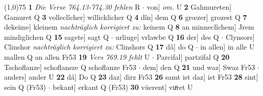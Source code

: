 \documentclass[8pt,a4paper,notitlepage]{article}
\begin{document}
\begin{table}[ht]
\begin{minipage}[t]{0.5\linewidth}
\line(1,0){75} \newline
\textbf{1} \textit{Die Verse 764.13-774.30 fehlen} R   $\cdot$ von] \textit{om.} U \textbf{2} Gahmureten] Gamuret Q \textbf{3} volleclîcher] willicklicher Q \textbf{4} dîn] dem Q \textbf{6} grœzer] grozest Q \textbf{7} dekeime] kleinem \textit{nachträglich korrigiert zu:} keinem Q \textbf{8} an minneclîchem] Jrem mindiglichen Q \textbf{15} sagete] sagt Q  $\cdot$ urliuge] vrlawbe Q \textbf{16} der] des Q  $\cdot$ Clynsors] Clinshor \textit{nachträglich korrigiert zu:} Clinshors Q \textbf{17} dâ] do Q  $\cdot$ in allen] in alle U mallen Q an allen Fr53 \textbf{19} \textit{Vers 769.19 fehlt} U   $\cdot$ Parcifal] partzifal Q \textbf{20} Tschoflanze] schoflansze Q schoflanze Fr53  $\cdot$ dem] den Q \textbf{21} und waz] Swaz Fr53  $\cdot$ anders] ander U \textbf{22} dâ] Do Q \textbf{23} daz] dirz Fr53 \textbf{26} samt ist daz] ist Fr53 \textbf{28} sint] sein Q (Fr53)  $\cdot$ bekant] erkant Q (Fr53) \textbf{30} vüerent] vuͦret U \newline
\end{minipage}
\end{table}
\end{document}
